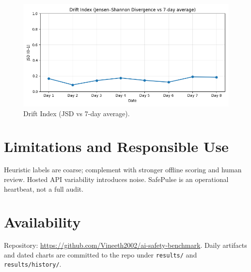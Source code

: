 \documentclass[11pt]{article}
\begin{document}
\begin{figure}[h]
\centering
\includegraphics[width=0.9\linewidth]{results/drift_index.png}
\caption{Drift Index (JSD vs 7-day average).}
\end{figure}

\section{Limitations and Responsible Use}
Heuristic labels are coarse; complement with stronger offline scoring and human review. Hosted API variability introduces noise. SafePulse is an operational heartbeat, not a full audit.

\section{Availability}
Repository: \url{https://github.com/Vineeth2002/ai-safety-benchmark}. Daily artifacts and dated charts are committed to the repo under \texttt{results/} and \texttt{results/history/}.
\end{document}
